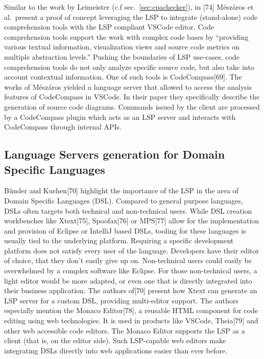 \documentclass[
  a4paper,
  bibtex,
  english,
  nomenclature]{kthlatex/kththesis/kththesis}
\begin{document}
Similar to the work by Leimeister (c.f sec.~\ref{sec:cpachecker}), in
{[}74{]} Mészáros et al.~present a proof of concept leveraging the LSP
to integrate (stand-alone) code comprehension tools with the LSP
compliant VSCode editor. Code comprehension tools support the work with
complex code bases by ``providing various textual information,
visualization views and source code metrics on multiple abstraction
levels.'' Pushing the boundaries of LSP use-cases, code comprehension
tools do not only analyze specific source code, but also take into
account contextual information. One of such tools is
CodeCompass{[}69{]}. The works of Mészáros yielded a language server
that allowed to access the analysis features of CodeCompass in VSCode.
In their paper they specifically describe the generation of source code
diagrams. Commands issued by the client are processed by a CodeCompass
plugin which acts as an LSP server and interacts with CodeCompass
through internal APIs.

\hypertarget{sec:language-servers-generation-for-domain-specific-languages}{%
\subsection{Language Servers generation for Domain Specific
Languages}\label{sec:language-servers-generation-for-domain-specific-languages}}

Bünder and Kuchen{[}70{]} highlight the importance of the LSP in the
area of Domain Specific Languages (DSL). Compared to general purpose
languages, DSLs often targets both technical and non-technical users.
While DSL creation workbenches like Xtext{[}75{]}, Spoofax{[}76{]} or
MPS{[}77{]} allow for the implementation and provision of Eclipse or
IntelliJ based DSLs, tooling for these languages is usually tied to the
underlying platform. Requiring a specific development platform does not
satisfy every user of the language. Developers have their editor of
choice, that they don't easily give up on. Non-technical users could
easily be overwhelmed by a complex software like Eclipse. For those
non-technical users, a light editor would be more adapted, or even one
that is directly integrated into their business application. The authors
of{[}70{]} present how Xtext can generate an LSP server for a custom
DSL, providing multi-editor support. The authors especially mention the
Monaco Editor{[}78{]}, a reusable HTML component for code editing using
web technologies. It is used in products like VSCode, Theia{[}79{]} and
other web accessible code editors. The Monaco Editor supports the LSP as
a client (that is, on the editor side). Such LSP-capable web editors
make integrating DSLs directly into web applications easier than ever
before.
\end{document}
